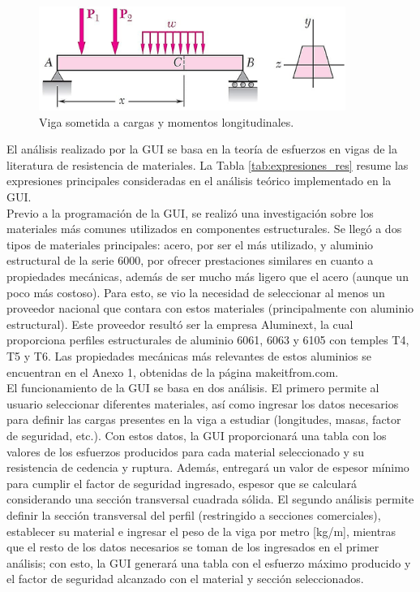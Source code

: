 \begin{figure}[H]
	\centering
	\includegraphics[width=10cm]{imagenes/viga_sometida}
	\caption{Viga sometida a cargas y momentos longitudinales.}
	\label{fig:viga_sometida}
\end{figure}

El análisis realizado por la GUI se basa en la teoría de esfuerzos en vigas de la literatura de resistencia de materiales. La Tabla \ref{tab:expresiones_res} resume las expresiones principales consideradas en el análisis teórico implementado en la GUI.\\

Previo a la programación de la GUI, se realizó una investigación sobre los materiales más comunes utilizados en componentes estructurales. Se llegó a dos tipos de materiales principales: acero, por ser el más utilizado, y aluminio estructural de la serie 6000, por ofrecer prestaciones similares en cuanto a propiedades mecánicas, además de ser mucho más ligero que el acero (aunque un poco más costoso). Para esto, se vio la necesidad de seleccionar al menos un proveedor nacional que contara con estos materiales (principalmente con aluminio estructural). Este proveedor resultó ser la empresa Aluminext, la cual proporciona perfiles estructurales de aluminio 6061, 6063 y 6105 con temples T4, T5 y T6. Las propiedades mecánicas más relevantes de estos aluminios se encuentran en el Anexo 1, obtenidas de la página makeitfrom.com. \\

El funcionamiento de la GUI se basa en dos análisis. El primero permite al usuario seleccionar diferentes materiales, así como ingresar los datos necesarios para definir las cargas presentes en la viga a estudiar (longitudes, masas, factor de seguridad, etc.). Con estos datos, la GUI proporcionará una tabla con los valores de los esfuerzos producidos para cada material seleccionado y su resistencia de cedencia y ruptura. Además, entregará un valor de espesor mínimo para cumplir el factor de seguridad ingresado, espesor que se calculará considerando una sección transversal cuadrada sólida. El segundo análisis permite definir la sección transversal del perfil (restringido a secciones comerciales), establecer su material e ingresar el peso de la viga por metro [kg/m], mientras que el resto de los datos necesarios se toman de los ingresados en el primer análisis; con esto, la GUI generará una tabla con el esfuerzo máximo producido y el factor de seguridad alcanzado con el material y sección seleccionados.\\

